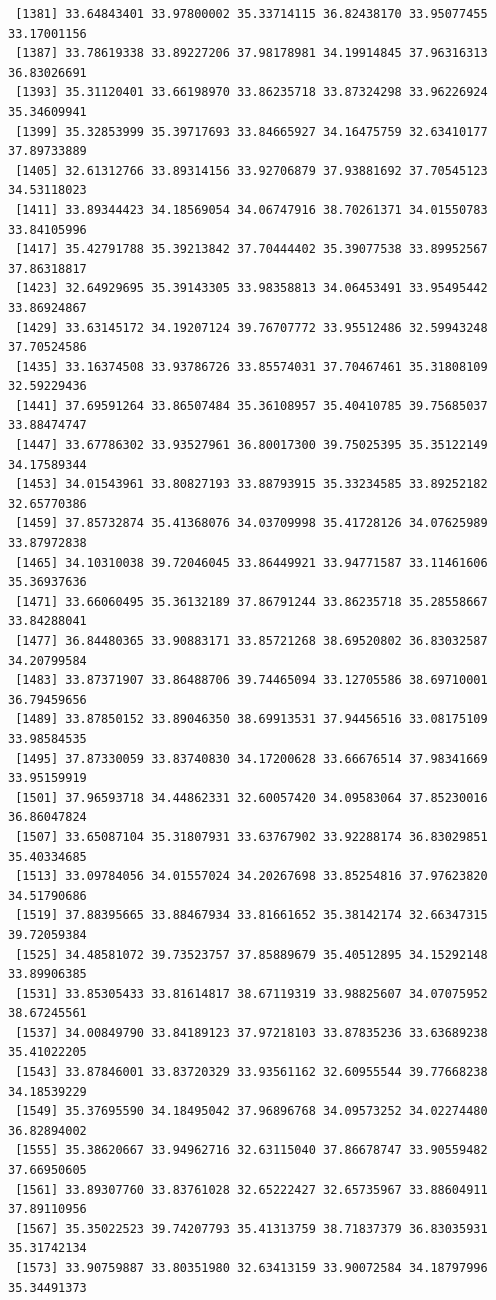 \documentclass[
  letterpaper,
  DIV=11,
  numbers=noendperiod]{scrartcl}
\begin{document}
\begin{verbatim}
 [1381] 33.64843401 33.97800002 35.33714115 36.82438170 33.95077455 33.17001156
 [1387] 33.78619338 33.89227206 37.98178981 34.19914845 37.96316313 36.83026691
 [1393] 35.31120401 33.66198970 33.86235718 33.87324298 33.96226924 35.34609941
 [1399] 35.32853999 35.39717693 33.84665927 34.16475759 32.63410177 37.89733889
 [1405] 32.61312766 33.89314156 33.92706879 37.93881692 37.70545123 34.53118023
 [1411] 33.89344423 34.18569054 34.06747916 38.70261371 34.01550783 33.84105996
 [1417] 35.42791788 35.39213842 37.70444402 35.39077538 33.89952567 37.86318817
 [1423] 32.64929695 35.39143305 33.98358813 34.06453491 33.95495442 33.86924867
 [1429] 33.63145172 34.19207124 39.76707772 33.95512486 32.59943248 37.70524586
 [1435] 33.16374508 33.93786726 33.85574031 37.70467461 35.31808109 32.59229436
 [1441] 37.69591264 33.86507484 35.36108957 35.40410785 39.75685037 33.88474747
 [1447] 33.67786302 33.93527961 36.80017300 39.75025395 35.35122149 34.17589344
 [1453] 34.01543961 33.80827193 33.88793915 35.33234585 33.89252182 32.65770386
 [1459] 37.85732874 35.41368076 34.03709998 35.41728126 34.07625989 33.87972838
 [1465] 34.10310038 39.72046045 33.86449921 33.94771587 33.11461606 35.36937636
 [1471] 33.66060495 35.36132189 37.86791244 33.86235718 35.28558667 33.84288041
 [1477] 36.84480365 33.90883171 33.85721268 38.69520802 36.83032587 34.20799584
 [1483] 33.87371907 33.86488706 39.74465094 33.12705586 38.69710001 36.79459656
 [1489] 33.87850152 33.89046350 38.69913531 37.94456516 33.08175109 33.98584535
 [1495] 37.87330059 33.83740830 34.17200628 33.66676514 37.98341669 33.95159919
 [1501] 37.96593718 34.44862331 32.60057420 34.09583064 37.85230016 36.86047824
 [1507] 33.65087104 35.31807931 33.63767902 33.92288174 36.83029851 35.40334685
 [1513] 33.09784056 34.01557024 34.20267698 33.85254816 37.97623820 34.51790686
 [1519] 37.88395665 33.88467934 33.81661652 35.38142174 32.66347315 39.72059384
 [1525] 34.48581072 39.73523757 37.85889679 35.40512895 34.15292148 33.89906385
 [1531] 33.85305433 33.81614817 38.67119319 33.98825607 34.07075952 38.67245561
 [1537] 34.00849790 33.84189123 37.97218103 33.87835236 33.63689238 35.41022205
 [1543] 33.87846001 33.83720329 33.93561162 32.60955544 39.77668238 34.18539229
 [1549] 35.37695590 34.18495042 37.96896768 34.09573252 34.02274480 36.82894002
 [1555] 35.38620667 33.94962716 32.63115040 37.86678747 33.90559482 37.66950605
 [1561] 33.89307760 33.83761028 32.65222427 32.65735967 33.88604911 37.89110956
 [1567] 35.35022523 39.74207793 35.41313759 38.71837379 36.83035931 35.31742134
 [1573] 33.90759887 33.80351980 32.63413159 33.90072584 34.18797996 35.34491373

\end{verbatim}
\end{document}
